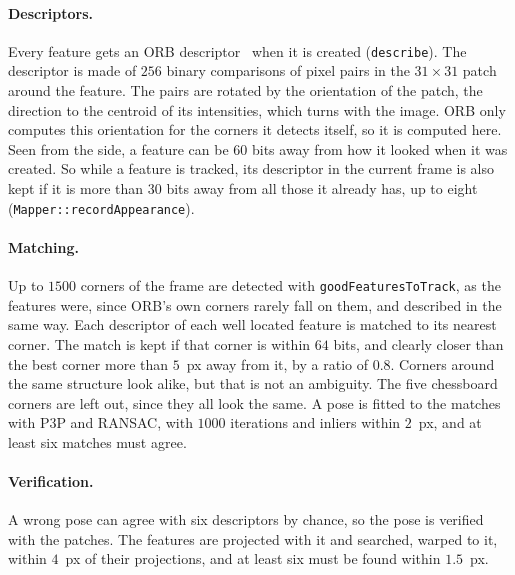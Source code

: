 \documentclass[11pt]{article}
\begin{document}
\paragraph{Descriptors.}
Every feature gets an ORB descriptor~\cite{rublee2011} when it is created (\texttt{describe}). The
descriptor is made of $256$ binary comparisons of pixel pairs in the $31 \times 31$ patch around the
feature. The pairs are rotated by the orientation of the patch, the direction to the centroid of its
intensities, which turns with the image. ORB only computes this orientation for the corners it detects itself, so it is computed
here. Seen from the side, a feature can be $60$ bits away from how it looked when it was created.
So while a feature is tracked, its descriptor in the current frame is also kept if it is more than
$30$ bits away from all those it already has, up to eight (\texttt{Mapper::recordAppearance}).

\paragraph{Matching.}
Up to $1500$ corners of the frame are detected with \texttt{goodFeaturesToTrack}, as the features
were, since ORB's own corners rarely fall on them, and described in the same way. Each descriptor of
each well located feature is matched to its nearest corner. The match is kept if that corner is
within $64$ bits, and clearly closer than the best corner more than $5$~px away from it, by a ratio
of $0.8$. Corners
around the same structure look alike, but that is not an ambiguity. The five chessboard corners
are left out, since they all look the same. A pose is fitted to the matches with P3P and RANSAC,
with $1000$ iterations and inliers within $2$~px, and at least six matches must agree.

\paragraph{Verification.}
A wrong pose can agree with six descriptors by chance, so the pose is verified with the patches.
The features are projected with it and searched, warped to it, within $4$~px of their projections,
and at least six must be found within $1.5$~px.
\end{document}
